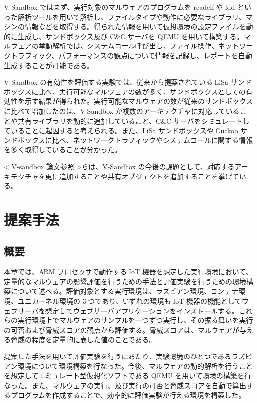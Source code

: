 \documentclass[12pt,a4paper,titlepage,report]{jsbook}
\begin{document}
V-Sandbox ではまず、実行対象のマルウェアのプログラムを readelf や ldd といった解析ツールを用いて解析し、ファイルタイプや動作に必要なライブラリ、マシンの情報などを取得する。得られた情報を用いて仮想環境の設定ファイルを動的に生成し、サンドボックス及び C\&C サーバを QEMU を用いて構築する。マルウェアの挙動解析では、システムコール呼び出し、ファイル操作、ネットワークトラフィック、パフォーマンスの観点について情報を記録し、レポートを自動生成することが可能である。

V-Sandbox の有効性を評価する実験では、従来から提案されている LiSa サンドボックスに比べ、実行可能なマルウェアの数が多く、サンドボックスとしての有効性を示す結果が得られた。実行可能なマルウェアの数が従来のサンドボックスに比べて増加したのは、V-Sandbox が複数のアーキテクチャに対応していることや共有ライブラリを動的に追加していること、C\&C サーバをシミュレートしていることに起因すると考えられる。また、LiSa サンドボックスや Cuckoo サンドボックスに比べ、ネットワークトラフィックやシステムコールに関する情報を多く取得していることが分かった。

< V-sandbox 論文参照 >らは、V-Sandbox の今後の課題として、対応するアーキテクチャを更に追加することや共有オブジェクトを追加することを挙げている。




\chapter{提案手法}
\section{概要}
本章では、ARM プロセッサで動作する IoT 機器を想定した実行環境において、定量的なマルウェアの影響評価を行うための手法と評価実験を行うための環境構築について述べる。評価対象とする実行環境は、ラズビアン環境、コンテナ環境、ユニカーネル環境の 3 つであり、いずれの環境も IoT 機器の機能としてウェブサーバを想定してウェブサーバアプリケーションをインストールする。これらの実行環境上でマルウェアのサンプルを一つずつ実行し、その振る舞いを実行の可否および脅威スコアの観点から評価する。脅威スコアは、マルウェアが与える脅威の程度を定量的に表した値のことである。

提案した手法を用いて評価実験を行うにあたり、実験環境のひとつであるラズビアン環境について環境構築を行なった。今後、マルウェアの動的解析を行うことを想定してエミュレート型仮想化ソフトである QEMU を用いて環境の構築を行なった。また、マルウェアの実行、及び実行の可否と脅威スコアを自動で算出するプログラムを作成することで、効率的に評価実験が行える環境を構築した。
\end{document}
